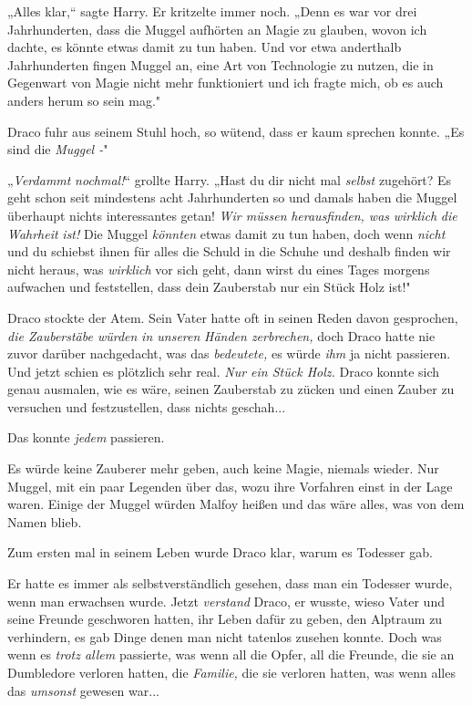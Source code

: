 {„Alles klar,“ sagte Harry. Er kritzelte immer noch. „Denn es war vor drei Jahrhunderten, dass die Muggel aufhörten an Magie zu glauben, wovon ich dachte, es könnte etwas damit zu tun haben. Und vor etwa anderthalb Jahrhunderten fingen Muggel an, eine Art von Technologie zu nutzen, die in Gegenwart von Magie nicht mehr funktioniert und ich fragte mich, ob es auch anders herum so sein mag."

Draco fuhr aus seinem Stuhl hoch, so wütend, dass er kaum sprechen konnte. „Es sind die \emph{Muggel -}"

„\emph{Verdammt} \emph{nochmal!}“ grollte Harry. „Hast du dir nicht mal \emph{selbst} zugehört? Es geht schon seit mindestens acht Jahrhunderten so und damals haben die Muggel überhaupt nichts interessantes getan! \emph{Wir müssen} \emph{herausfinden, was} \emph{wirklich} \emph{die} \emph{Wahrheit} \emph{ist!} Die Muggel \emph{könnten} etwas damit zu tun haben, doch wenn \emph{nicht} und du schiebst ihnen für alles die Schuld in die Schuhe und deshalb finden wir nicht heraus, was \emph{wirklich} vor sich geht, dann wirst du eines Tages morgens aufwachen und feststellen, dass dein Zauberstab nur ein Stück Holz ist!"

Draco stockte der Atem. Sein Vater hatte oft in seinen Reden davon gesprochen, \emph{die Zauberstäbe würden} \emph{in unseren} \emph{Händen zerbrechen,} doch Draco hatte nie zuvor darüber nachgedacht, was das \emph{bedeutete,} es würde \emph{ihm} ja nicht passieren. Und jetzt schien es plötzlich sehr real. \emph{Nur ein Stück Holz.} Draco konnte sich genau ausmalen, wie es wäre, seinen Zauberstab zu zücken und einen Zauber zu versuchen und festzustellen, dass nichts geschah...

Das konnte \emph{jedem} passieren.

Es würde keine Zauberer mehr geben, auch keine Magie, niemals wieder. Nur Muggel, mit ein paar Legenden über das, wozu ihre Vorfahren einst in der Lage waren. Einige der Muggel würden Malfoy heißen und das wäre alles, was von dem Namen blieb.

Zum ersten mal in seinem Leben wurde Draco klar, warum es Todesser gab.

Er hatte es immer als selbstverständlich gesehen, dass man ein Todesser wurde, wenn man erwachsen wurde. Jetzt \emph{verstand} Draco, er wusste, wieso Vater und seine Freunde geschworen hatten, ihr Leben dafür zu geben, den Alptraum zu verhindern, es gab Dinge denen man nicht tatenlos zusehen konnte. Doch was wenn es \emph{trotz allem} passierte, was wenn all die Opfer, all die Freunde, die sie an Dumbledore verloren hatten, die \emph{Familie,} die sie verloren hatten, was wenn alles das \emph{umsonst} gewesen war...

}
